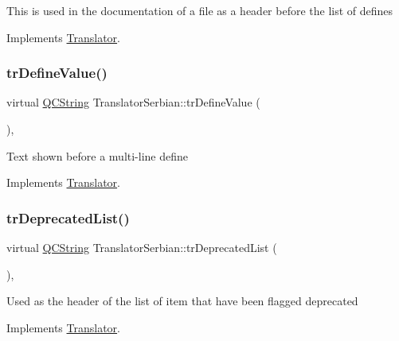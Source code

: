 This is used in the documentation of a file as a header before the list of defines 

Implements \mbox{\hyperlink{class_translator}{Translator}}.

\mbox{\label{class_translator_serbian_a6d9663a10eae3f9fcf5c6aad9a14c1ef}} 
\subsubsection{\texorpdfstring{trDefineValue()}{trDefineValue()}}
{\footnotesize\ttfamily virtual \mbox{\hyperlink{class_q_c_string}{Q\+C\+String}} Translator\+Serbian\+::tr\+Define\+Value (\begin{DoxyParamCaption}{ }\end{DoxyParamCaption})\hspace{0.3cm}{\ttfamily [inline]}, {\ttfamily [virtual]}}

Text shown before a multi-\/line define 

Implements \mbox{\hyperlink{class_translator}{Translator}}.

\mbox{\label{class_translator_serbian_acf2babf56c55bc06c64c350e23ee9de2}} 
\subsubsection{\texorpdfstring{trDeprecatedList()}{trDeprecatedList()}}
{\footnotesize\ttfamily virtual \mbox{\hyperlink{class_q_c_string}{Q\+C\+String}} Translator\+Serbian\+::tr\+Deprecated\+List (\begin{DoxyParamCaption}{ }\end{DoxyParamCaption})\hspace{0.3cm}{\ttfamily [inline]}, {\ttfamily [virtual]}}

Used as the header of the list of item that have been flagged deprecated 

Implements \mbox{\hyperlink{class_translator}{Translator}}.

\mbox{\label{class_translator_serbian_a1ff22edadca264eb2479eb72ede71506}} 
